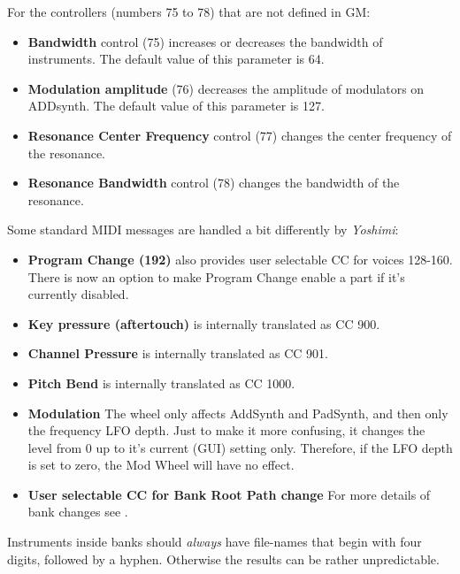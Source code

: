    For the controllers (numbers 75 to 78) that are not defined in GM:

   \begin{itemize}
      \item \textbf{Bandwidth} control (75) increases or decreases the bandwidth
      of instruments. The default value of this parameter is 64. 
      \item \textbf{Modulation amplitude} (76) decreases the amplitude of
      modulators on ADDsynth. The default value of this parameter is 127. 
      \item \textbf{Resonance Center Frequency} control (77) changes the center
      frequency of the resonance. 
      \item \textbf{Resonance Bandwidth} control (78) changes the bandwidth of the
      resonance. 
   \end{itemize}

   Some standard MIDI messages are handled a bit differently by
   \textsl{Yoshimi}:

   \begin{itemize}
      \item \textbf{Program Change (192)}
         also provides user selectable CC for
         voices 128-160.  There is now an option to make Program Change enable
         a part if it's currently disabled.
      \item \textbf{Key pressure (aftertouch)}
         is internally translated as CC 900.
      \item \textbf{Channel Pressure}
         is internally translated as CC 901.
      \item \textbf{Pitch Bend}
         is internally translated as CC 1000.
      \item \textbf{Modulation}
         The wheel only affects AddSynth and PadSynth, and then only the
         frequency LFO depth. Just to make it more confusing, it changes the
         level from 0 up to it's current (GUI) setting only. Therefore, if the
         LFO depth is set to zero, the Mod Wheel will have no effect.
      \item \textbf{User selectable CC for Bank Root Path change}
         For more details of bank changes see
         .
   \end{itemize}

   Instruments inside banks should \textsl{always} have file-names that
   begin with four digits,  followed
   by a hyphen. Otherwise the results can be rather unpredictable.

